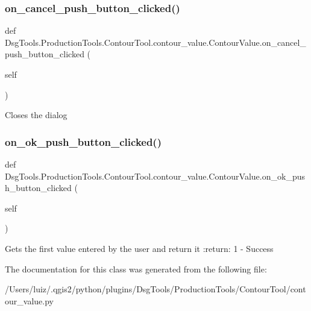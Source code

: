 \subsubsection{\texorpdfstring{on\+\_\+cancel\+\_\+push\+\_\+button\+\_\+clicked()}{on\_cancel\_push\_button\_clicked()}}
{\footnotesize\ttfamily def Dsg\+Tools.\+Production\+Tools.\+Contour\+Tool.\+contour\+\_\+value.\+Contour\+Value.\+on\+\_\+cancel\+\_\+push\+\_\+button\+\_\+clicked (\begin{DoxyParamCaption}\item[{}]{self }\end{DoxyParamCaption})}

\begin{DoxyVerb}Closes the dialog
\end{DoxyVerb}
 \mbox{\label{class_dsg_tools_1_1_production_tools_1_1_contour_tool_1_1contour__value_1_1_contour_value_aa36c4ebedb082e8c01aab94f2d762c2e}} 
\subsubsection{\texorpdfstring{on\+\_\+ok\+\_\+push\+\_\+button\+\_\+clicked()}{on\_ok\_push\_button\_clicked()}}
{\footnotesize\ttfamily def Dsg\+Tools.\+Production\+Tools.\+Contour\+Tool.\+contour\+\_\+value.\+Contour\+Value.\+on\+\_\+ok\+\_\+push\+\_\+button\+\_\+clicked (\begin{DoxyParamCaption}\item[{}]{self }\end{DoxyParamCaption})}

\begin{DoxyVerb}Gets the first value entered by the user and return it
:return: 1 - Success
\end{DoxyVerb}
 

The documentation for this class was generated from the following file\+:\begin{DoxyCompactItemize}
\item 
/\+Users/luiz/.\+qgis2/python/plugins/\+Dsg\+Tools/\+Production\+Tools/\+Contour\+Tool/contour\+\_\+value.\+py\end{DoxyCompactItemize}
